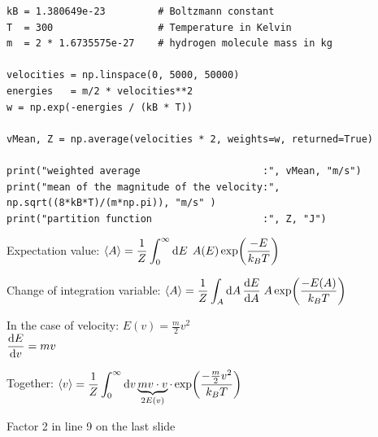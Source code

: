 
\begin{frame}[fragile]
%
\begin{codebox}
\begin{verbatim}
kB = 1.380649e-23         # Boltzmann constant
T  = 300                  # Temperature in Kelvin
m  = 2 * 1.6735575e-27    # hydrogen molecule mass in kg

velocities = np.linspace(0, 5000, 50000)
energies   = m/2 * velocities**2
w = np.exp(-energies / (kB * T))

vMean, Z = np.average(velocities * 2, weights=w, returned=True)

print("weighted average                     :", vMean, "m/s")
print("mean of the magnitude of the velocity:", np.sqrt((8*kB*T)/(m*np.pi)), "m/s" )
print("partition function                   :", Z, "J")
\end{verbatim}
\end{codebox}
%
\end{frame}


\begin{frame}
%
\begin{tcolorbox}[title=For Physicists]
\vspace{6pt}
Expectation value:
\tabto{5cm}
$ \displaystyle \expval{A} = \frac{1}{Z} \int_0^{\infty} \dd{E} \; A(E) \exp(\frac{-E}{k_B T}) $

\vspace{9pt}
Change of integration variable:
\tabto{5cm}
$ \displaystyle \expval{A} = \frac{1}{Z} \int_A \dd{A} \dv{E}{A} \; A \exp(\frac{-E(A)}{k_B T}) $

\vspace{15pt}
In the case of velocity:
\tabto{5cm}
$ \displaystyle E(v) = \frac{m}{2} v^{2} $\\
\vspace{9pt}
\tabto{5cm}
$ \displaystyle \dv{E}{v} = mv $

\vspace{9pt}
Together:
\tabto{5cm}
$ \displaystyle 
	\expval{v}
=
	\frac{1}{Z}
	\int_0^{\infty} \dd{v} 
		\underbrace{		
			mv \cdot v
		}_{2E(v)}
		\cdot \exp(\frac{-\frac{m}{2} v^2}{k_B T}) $

\vspace{9pt}
\Thus Factor 2 in line 9 on the last slide
\end{tcolorbox}
%
\end{frame}

